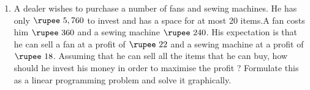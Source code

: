 \begin{enumerate}
\item A dealer wishes to purchase a number of fans and sewing machines. He has only $\rupee~5,760$ to invest and has a space for at most 20 items.A fan costs him $\rupee~360$ and a sewing machine $\rupee~240$. His expectation is that he can sell a fan at a profit of $\rupee~22$ and a sewing machine at a profit of $\rupee~18$. Assuming that he can sell all the items that he can buy, how should he invest his money in order to maximise the profit ? Formulate this as a linear programming problem and solve it graphically.
\end{enumerate}
